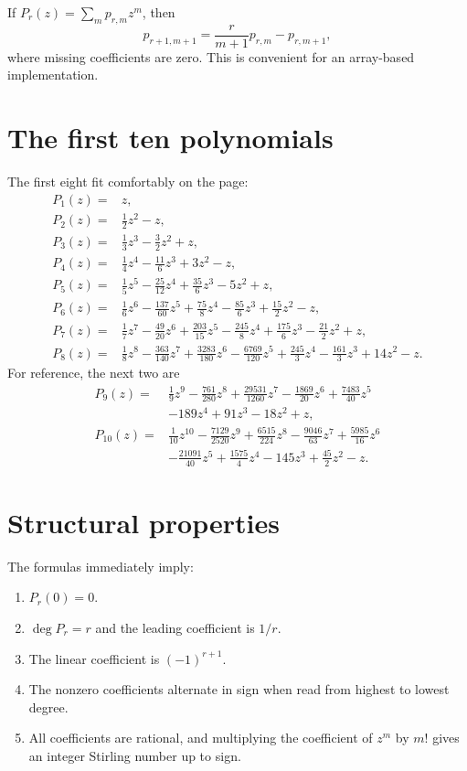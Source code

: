 \documentclass[11pt,oneside]{book}
\theoremstyle{definition}
\theoremstyle{remark}
\begin{document}
If $P_r(z)=\sum_m p_{r,m}z^m$, then
\begin{equation}\label{eq:P-coefficient-recurrence}
 p_{r+1,m+1}=\frac{r}{m+1}p_{r,m}-p_{r,m+1},
\end{equation}
where missing coefficients are zero.  This is convenient for an array-based
implementation.

\section{The first ten polynomials}
The first eight fit comfortably on the page:
\begin{align*}
 P_1(z)={}&z,\\
 P_2(z)={}&\frac12z^2-z,\\
 P_3(z)={}&\frac13z^3-\frac32z^2+z,\\
 P_4(z)={}&\frac14z^4-\frac{11}{6}z^3+3z^2-z,\\
 P_5(z)={}&\frac15z^5-\frac{25}{12}z^4
              +\frac{35}{6}z^3-5z^2+z,\\
 P_6(z)={}&\frac16z^6-\frac{137}{60}z^5
              +\frac{75}{8}z^4-\frac{85}{6}z^3
              +\frac{15}{2}z^2-z,\\
 P_7(z)={}&\frac17z^7-\frac{49}{20}z^6
              +\frac{203}{15}z^5-\frac{245}{8}z^4
              +\frac{175}{6}z^3-\frac{21}{2}z^2+z,\\
 P_8(z)={}&\frac18z^8-\frac{363}{140}z^7
              +\frac{3283}{180}z^6-\frac{6769}{120}z^5
              +\frac{245}{3}z^4-\frac{161}{3}z^3
              +14z^2-z.
\end{align*}
For reference, the next two are
\begin{align*}
 P_9(z)={}&\frac19z^9-\frac{761}{280}z^8
 +\frac{29531}{1260}z^7-\frac{1869}{20}z^6
 +\frac{7483}{40}z^5\\
 &-189z^4+91z^3-18z^2+z,\\
 P_{10}(z)={}&\frac1{10}z^{10}-\frac{7129}{2520}z^9
 +\frac{6515}{224}z^8-\frac{9046}{63}z^7
 +\frac{5985}{16}z^6\\
 &-\frac{21091}{40}z^5+\frac{1575}{4}z^4
 -145z^3+\frac{45}{2}z^2-z.
\end{align*}

\section{Structural properties}
The formulas immediately imply:
\begin{enumerate}
\item $P_r(0)=0$.
\item $\deg P_r=r$ and the leading coefficient is $1/r$.
\item The linear coefficient is $(-1)^{r+1}$.
\item The nonzero coefficients alternate in sign when read from highest to
      lowest degree.
\item All coefficients are rational, and multiplying the coefficient of
      $z^m$ by $m!$ gives an integer Stirling number up to sign.
\end{enumerate}
\end{document}
